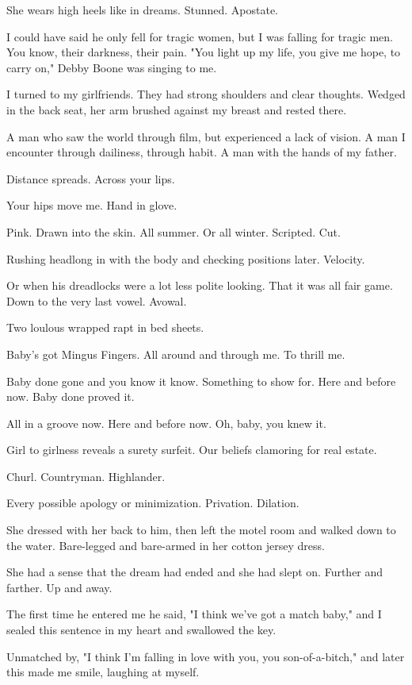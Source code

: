 \documentclass[
]{memoir}
\begin{document}
She wears high heels like in dreams. Stunned. Apostate.

I could have said he only fell for tragic women, but I was falling for
tragic men. You know, their darkness, their pain. "You light up my life,
you give me hope, to carry on," Debby Boone was singing to me.

I turned to my girlfriends. They had strong shoulders and clear
thoughts. Wedged in the back seat, her arm brushed against my breast and
rested there.

A man who saw the world through film, but experienced a lack of vision.
A man I encounter through dailiness, through habit. A man with the hands
of my father.

Distance spreads. Across your lips.

Your hips move me. Hand in glove.

Pink. Drawn into the skin. All summer. Or all winter. Scripted. Cut.

Rushing headlong in with the body and checking positions later.
Velocity.

Or when his dreadlocks were a lot less polite looking. That it was all
fair game. Down to the very last vowel. Avowal.

Two loulous wrapped rapt in bed sheets.

Baby's got Mingus Fingers. All around and through me. To thrill me.

Baby done gone and you know it know. Something to show for. Here and
before now. Baby done proved it.

All in a groove now. Here and before now. Oh, baby, you knew it.

Girl to girlness reveals a surety surfeit. Our beliefs clamoring for
real estate.

Churl. Countryman. Highlander.

Every possible apology or minimization. Privation. Dilation.

She dressed with her back to him, then left the motel room and walked
down to the water. Bare-legged and bare-armed in her cotton jersey
dress.

She had a sense that the dream had ended and she had slept on. Further
and farther. Up and away.

The first time he entered me he said, "I think we've got a match baby,"
and I sealed this sentence in my heart and swallowed the key.

Unmatched by, "I think I'm falling in love with you, you
son-of-a-bitch," and later this made me smile, laughing at myself.
\end{document}
